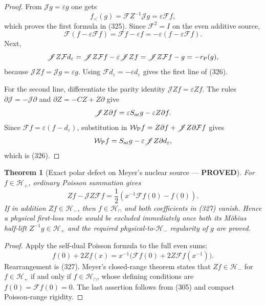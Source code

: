 \documentclass[11pt]{article}
\newtheorem{theorem}{Theorem}
\newcommand{\PROVED}{\textcolor{green!45!black}{\textbf{PROVED}}}
\begin{document}
\begin{proof}
From $\mathscr Jg=\varepsilon g$ one gets
\[
 f_<(g)=\mathcal FZ^{-1}\mathscr Jg
       =\varepsilon\mathcal Ff,
\]
which proves the first formula in (325).  Since $\mathcal F^2=I$ on the
even additive source,
\[
 \mathcal F(f-\varepsilon\mathcal Ff)
 =\mathcal Ff-\varepsilon f
 =-\varepsilon(f-\varepsilon\mathcal Ff).
\]
Next,
\[
 \mathscr JZ\mathcal Fd_{\varepsilon}
 =\mathscr JZ\mathcal Ff-\varepsilon\mathscr JZf
 =\mathscr JZ\mathcal Ff-g=-r_{\rm P}(g),
\]
because $\mathscr JZf=\mathscr Jg=\varepsilon g$.  Using
$\mathcal Fd_{\varepsilon}=-\varepsilon d_{\varepsilon}$ gives the first
line of (326).

For the second line, differentiate the parity identity
$\mathscr JZf=\varepsilon Zf$.  The rules
$\partial\mathscr J=-\mathscr J\partial$ and
$\partial Z=-CZ+Z\partial$ give
\[
 \mathscr JZ\partial f
 =\varepsilon S_{\rm ar}g-\varepsilon Z\partial f.
\]
Since $\mathcal Ff=\varepsilon(f-d_{\varepsilon})$, substitution in
$\mathcal W_{\rm P}f=Z\partial f+\mathscr JZ\partial\mathcal Ff$
gives
\[
 \mathcal W_{\rm P}f
 =S_{\rm ar}g-\varepsilon\mathscr JZ\partial d_{\varepsilon},
\]
which is (326).
\end{proof}

\begin{theorem}[Exact polar defect on Meyer's nuclear source --- \PROVED]
For $f\in\mathcal H_+$, ordinary Poisson summation gives
\begin{equation}
 Zf-\mathscr JZ\mathcal Ff
 =\frac12\left(x^{-1}\mathcal Ff(0)-f(0)\right).       \tag{327}
\end{equation}
If in addition $Zf\in\mathcal H_-$, then $f\in\mathcal H_\cap$ and both
coefficients in (327) vanish.  Hence a physical first-loss mode would be
excluded immediately once both its M\"obius half-lift $Z^{-1}g\in\mathcal
H_+$ and the required physical-to-$\mathcal H_-$ regularity of $g$ are
proved.
\end{theorem}

\begin{proof}
Apply the self-dual Poisson formula to the full even sums:
\[
 f(0)+2Zf(x)
 =x^{-1}\bigl(\mathcal Ff(0)+2Z\mathcal Ff(x^{-1})\bigr).
\]
Rearrangement is (327).  Meyer's closed-range theorem states that
$Zf\in\mathcal H_-$ for $f\in\mathcal H_+$ if and only if
$f\in\mathcal H_\cap$, whose defining conditions are
$f(0)=\mathcal Ff(0)=0$.  The last assertion follows from (305) and compact
Poisson-range rigidity.
\end{proof}
\end{document}
